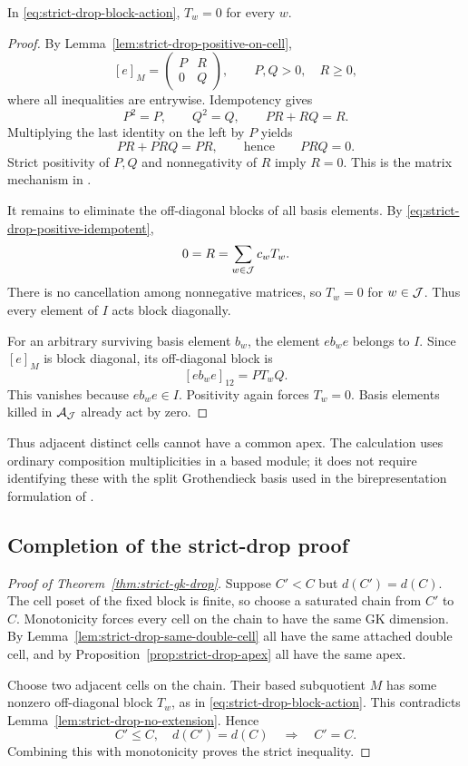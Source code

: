 \begin{lem}
\label{lem:strict-drop-no-extension}
In \eqref{eq:strict-drop-block-action}, $T_w=0$ for every $w$.
\end{lem}

\begin{proof}
By Lemma~\ref{lem:strict-drop-positive-on-cell},
\begin{equation}\label{eq:strict-drop-idempotent-blocks}
  [e]_M=
  \begin{pmatrix}
    P&R\\
    0&Q
  \end{pmatrix},
  \qquad P,Q>0,\quad R\geq0,
\end{equation}
where all inequalities are entrywise. Idempotency gives
\[
  P^2=P,\qquad Q^2=Q,\qquad PR+RQ=R.
\]
Multiplying the last identity on the left by $P$ yields
\[
  PR+PRQ=PR,\qquad\text{hence}\qquad PRQ=0.
\]
Strict positivity of $P,Q$ and nonnegativity of $R$ imply $R=0$. This is
the matrix mechanism in \cite[Lem.~2]{MackaayMazorchukMiemietz2024}.

It remains to eliminate the off-diagonal blocks of all basis elements.
By \eqref{eq:strict-drop-positive-idempotent},
\[
  0=R=\sum_{w\in\mathcal{J}}c_wT_w.
\]
There is no cancellation among nonnegative matrices, so $T_w=0$ for
$w\in\mathcal{J}$. Thus every element of $I$ acts block diagonally.

For an arbitrary surviving basis element $b_w$, the element $eb_we$ belongs
to $I$. Since $[e]_M$ is block diagonal, its off-diagonal block is
\[
  [eb_we]_{12}=PT_wQ.
\]
This vanishes because $eb_we\in I$. Positivity again forces $T_w=0$.
Basis elements killed in $\mathcal A_{\mathcal{J}}$ already act by zero.
\end{proof}

Thus adjacent distinct cells cannot have a common apex. The calculation
uses ordinary composition multiplicities in a based module; it does not
require identifying these with the split Grothendieck basis used in the
birepresentation formulation of \cite[Lem.~2]{MackaayMazorchukMiemietz2024}.

\subsection{Completion of the strict-drop proof}

\begin{proof}[Proof of Theorem~\ref{thm:strict-gk-drop}]
Suppose $C'<C$ but $d(C')=d(C)$. The cell poset of the fixed block is finite,
so choose a saturated chain from $C'$ to $C$. Monotonicity forces every
cell on the chain to have the same GK dimension. By
Lemma~\ref{lem:strict-drop-same-double-cell} all have the same attached
double cell, and by Proposition~\ref{prop:strict-drop-apex} all have the
same apex.

Choose two adjacent cells on the chain. Their based subquotient $M$ has
some nonzero off-diagonal block $T_w$, as in
\eqref{eq:strict-drop-block-action}. This contradicts
Lemma~\ref{lem:strict-drop-no-extension}. Hence
\[
  C'\leq C,\quad d(C')=d(C)\quad\Longrightarrow\quad C'=C.
\]
Combining this with monotonicity proves the strict inequality.
\end{proof}


